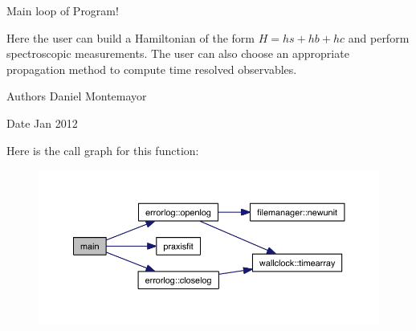 Main loop of Program! 

Here the user can build a Hamiltonian of the form $H=hs+hb+hc$ and perform spectroscopic measurements. The user can also choose an appropriate propagation method to compute time resolved observables. \begin{DoxyAuthor}{Authors}
Daniel Montemayor
\end{DoxyAuthor}
\begin{DoxyDate}{Date}
Jan 2012 
\end{DoxyDate}
Here is the call graph for this function\+:\nopagebreak
\begin{figure}[H]
\begin{center}
\leavevmode
\includegraphics[width=350pt]{src_2system__driver_8f90_a8ec2266d83cd6c0b762cbcbc92c0af3d_cgraph}
\end{center}
\end{figure}
